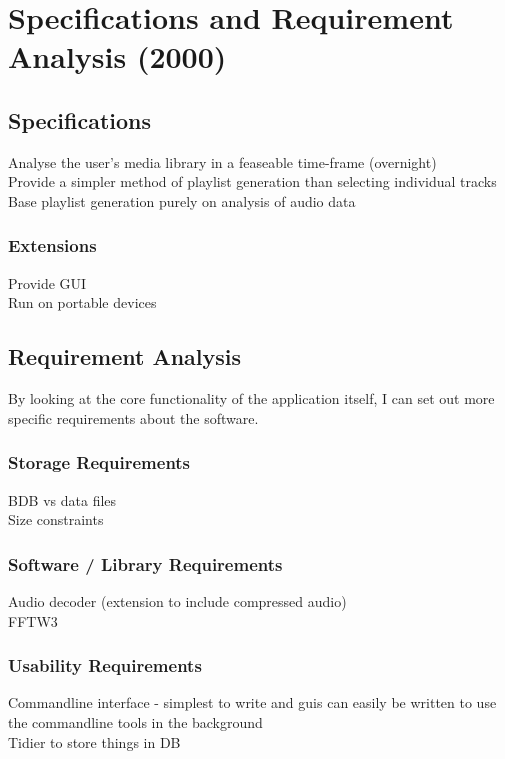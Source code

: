 \chapter{Specifications and Requirement Analysis (2000)}
\section{Specifications}
Analyse the user's media library in a feaseable time-frame (overnight)\\
Provide a simpler method of playlist generation than selecting individual tracks\\
Base playlist generation purely on analysis of audio data
\subsection{Extensions}
Provide GUI\\
Run on portable devices
\section{Requirement Analysis}
By looking at the core functionality of the application itself, I can set out more specific requirements about the software.
\subsection{Storage Requirements}
BDB vs data files\\
Size constraints
\subsection{Software / Library Requirements}
Audio decoder (extension to include compressed audio)\\
FFTW3
\subsection{Usability Requirements}
Commandline interface - simplest to write and guis can easily be written to use the commandline tools in the background\\
Tidier to store things in DB


